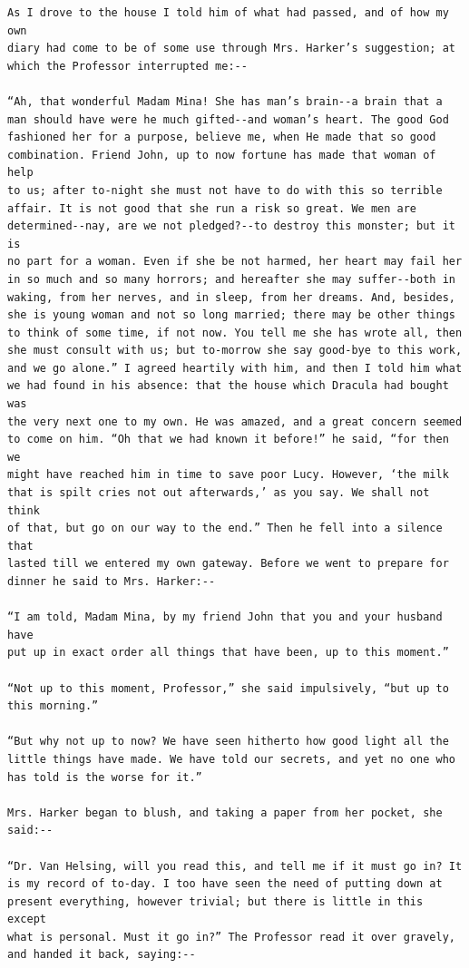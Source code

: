 \documentclass{article}
\begin{document}
\begin{verbatim}
As I drove to the house I told him of what had passed, and of how my own
diary had come to be of some use through Mrs. Harker’s suggestion; at
which the Professor interrupted me:--

“Ah, that wonderful Madam Mina! She has man’s brain--a brain that a
man should have were he much gifted--and woman’s heart. The good God
fashioned her for a purpose, believe me, when He made that so good
combination. Friend John, up to now fortune has made that woman of help
to us; after to-night she must not have to do with this so terrible
affair. It is not good that she run a risk so great. We men are
determined--nay, are we not pledged?--to destroy this monster; but it is
no part for a woman. Even if she be not harmed, her heart may fail her
in so much and so many horrors; and hereafter she may suffer--both in
waking, from her nerves, and in sleep, from her dreams. And, besides,
she is young woman and not so long married; there may be other things
to think of some time, if not now. You tell me she has wrote all, then
she must consult with us; but to-morrow she say good-bye to this work,
and we go alone.” I agreed heartily with him, and then I told him what
we had found in his absence: that the house which Dracula had bought was
the very next one to my own. He was amazed, and a great concern seemed
to come on him. “Oh that we had known it before!” he said, “for then we
might have reached him in time to save poor Lucy. However, ‘the milk
that is spilt cries not out afterwards,’ as you say. We shall not think
of that, but go on our way to the end.” Then he fell into a silence that
lasted till we entered my own gateway. Before we went to prepare for
dinner he said to Mrs. Harker:--

“I am told, Madam Mina, by my friend John that you and your husband have
put up in exact order all things that have been, up to this moment.”

“Not up to this moment, Professor,” she said impulsively, “but up to
this morning.”

“But why not up to now? We have seen hitherto how good light all the
little things have made. We have told our secrets, and yet no one who
has told is the worse for it.”

Mrs. Harker began to blush, and taking a paper from her pocket, she
said:--

“Dr. Van Helsing, will you read this, and tell me if it must go in? It
is my record of to-day. I too have seen the need of putting down at
present everything, however trivial; but there is little in this except
what is personal. Must it go in?” The Professor read it over gravely,
and handed it back, saying:--


\end{verbatim}
\end{document}
